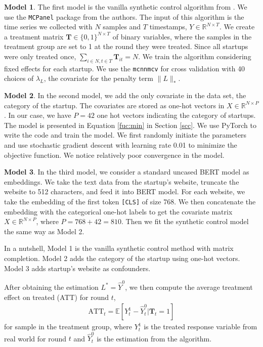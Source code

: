 \documentclass[12pt]{article}
\begin{document}
\textbf{Model 1}. The first model is the vanilla synthetic control algorithm from \cite{athey2021matrix}. We use the \texttt{MCPanel} package from the authors. The input of this algorithm is the time series we collected with $N$ samples and $T$ timestamps, $Y \in \mathbb{R}^{N \times T}$. We create a treatment matrix $\mathbf{T} \in \{0, 1\}^{N \times T}$ of binary variables, where the samples in the treatment group are set to 1 at the round they were treated. Since all startups were only treated once, $\sum_{i\in N, t\in T} \mathbf{T}_{it} = N$. We train the algorithm considering fixed effects for each startup. We use the \texttt{mcnnmcv} for cross validation with 40 choices of $\lambda_L$, the covariate for the penalty term $\|L\|_*$.

\textbf{Model 2}. In the second model, we add the only covariate in the data set, the category of the startup. The covariates are stored as one-hot vectors in $X \in \mathbb{R}^{N \times P}$. In our case, we have $P = 42$ one hot vectors indicating the category of startups. The model is presented in Equation \ref{fuc:min} in Section \ref{scc}. We use PyTorch to write the code and train the model. We first  randomly initiate the parameters and use stochastic gradient descent with learning rate 0.01 to minimize the objective function. We notice relatively poor convergence in the model.

\textbf{Model 3}. In the third model, we consider a standard uncased BERT model as embeddings. We take the text data from the startup's website, truncate the website to 512 characters, and feed it into BERT model. For each website, we take the embedding of the first token \texttt{[CLS]} of size 768. We then concatenate the embedding with the categorical one-hot labels to get the covariate matrix $X \in \mathbb{R}^{N \times P}$, where $P = 768 + 42 = 810$. Then we fit the synthetic control model the same way as Model 2.

In a nutshell, Model 1 is the vanilla synthetic control method with matrix completion. Model 2 adds the category of the startup using one-hot vectors. Model 3 adds startup's website as confounders.

After obtaining the estimation $L^*=\hat Y^0$, we then compute the average treatment effect on treated (ATT) for round $t$,
\begin{align}
\label{eq:att}
\text{ATT}_t = \mathbb{E}[Y^{1}_t - \hat  Y^0_t | \mathbf{T}_t = 1]
\end{align}
for sample in the treatment group, where $Y^1_t$ is the treated response variable from real world for round $t$ and $\hat Y^0_t$ is the estimation from the algorithm.
\end{document}
